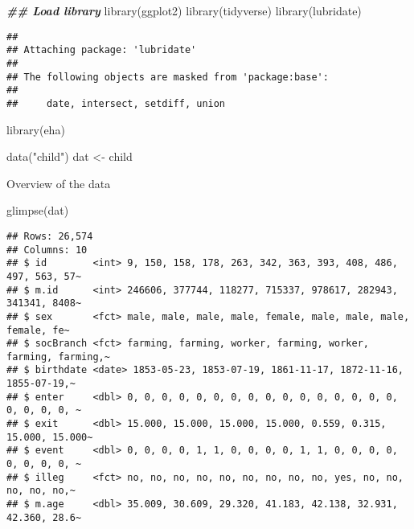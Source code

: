 \documentclass[
]{article}
\newenvironment{Shaded}{\begin{snugshade}}{\end{snugshade}}
\newcommand{\DocumentationTok}[1]{\textcolor[rgb]{0.56,0.35,0.01}{\textbf{\textit{#1}}}}
\newcommand{\FunctionTok}[1]{\textcolor[rgb]{0.00,0.00,0.00}{#1}}
\newcommand{\NormalTok}[1]{#1}
\newcommand{\OtherTok}[1]{\textcolor[rgb]{0.56,0.35,0.01}{#1}}
\newcommand{\StringTok}[1]{\textcolor[rgb]{0.31,0.60,0.02}{#1}}
\begin{document}
\begin{Shaded}
\begin{Highlighting}[]
\DocumentationTok{\#\# Load library}
\FunctionTok{library}\NormalTok{(ggplot2)}
\FunctionTok{library}\NormalTok{(tidyverse)}
\FunctionTok{library}\NormalTok{(lubridate)}
\end{Highlighting}
\end{Shaded}

\begin{verbatim}
## 
## Attaching package: 'lubridate'
## 
## The following objects are masked from 'package:base':
## 
##     date, intersect, setdiff, union
\end{verbatim}

\begin{Shaded}
\begin{Highlighting}[]
\FunctionTok{library}\NormalTok{(eha)}
\end{Highlighting}
\end{Shaded}

\begin{Shaded}
\begin{Highlighting}[]
\FunctionTok{data}\NormalTok{(}\StringTok{"child"}\NormalTok{)}
\NormalTok{dat }\OtherTok{\textless{}{-}}\NormalTok{ child}
\end{Highlighting}
\end{Shaded}

Overview of the data

\begin{Shaded}
\begin{Highlighting}[]
\FunctionTok{glimpse}\NormalTok{(dat)}
\end{Highlighting}
\end{Shaded}

\begin{verbatim}
## Rows: 26,574
## Columns: 10
## $ id        <int> 9, 150, 158, 178, 263, 342, 363, 393, 408, 486, 497, 563, 57~
## $ m.id      <int> 246606, 377744, 118277, 715337, 978617, 282943, 341341, 8408~
## $ sex       <fct> male, male, male, male, female, male, male, male, female, fe~
## $ socBranch <fct> farming, farming, worker, farming, worker, farming, farming,~
## $ birthdate <date> 1853-05-23, 1853-07-19, 1861-11-17, 1872-11-16, 1855-07-19,~
## $ enter     <dbl> 0, 0, 0, 0, 0, 0, 0, 0, 0, 0, 0, 0, 0, 0, 0, 0, 0, 0, 0, 0, ~
## $ exit      <dbl> 15.000, 15.000, 15.000, 15.000, 0.559, 0.315, 15.000, 15.000~
## $ event     <dbl> 0, 0, 0, 0, 1, 1, 0, 0, 0, 0, 1, 1, 0, 0, 0, 0, 0, 0, 0, 0, ~
## $ illeg     <fct> no, no, no, no, no, no, no, no, no, yes, no, no, no, no, no,~
## $ m.age     <dbl> 35.009, 30.609, 29.320, 41.183, 42.138, 32.931, 42.360, 28.6~
\end{verbatim}
\end{document}
